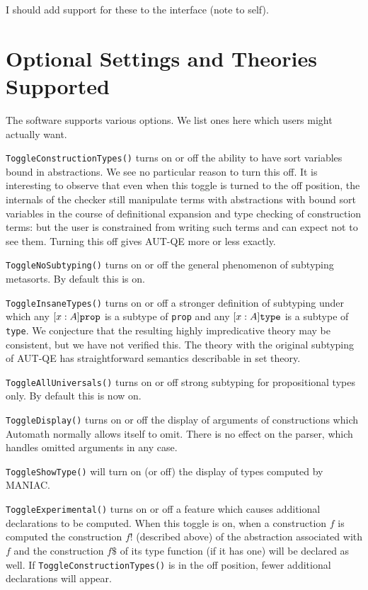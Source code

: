 \documentclass[12pt]{article}
\begin{document}
I should add support for these to the interface (note to self).

\newpage

\section{Optional Settings and Theories Supported}

The software supports various options.  We list ones here which users might actually want.

{\tt ToggleConstructionTypes()}  turns on or off the ability to have sort variables bound in abstractions.  We see no particular reason to turn this off.  It is interesting to observe that even when this toggle is turned to the off position, the internals of the checker still manipulate terms with abstractions with bound sort variables in the course of definitional expansion and type checking of construction terms:  but the user is constrained from writing such terms and can expect not to see them.  Turning this off gives AUT-QE more or less exactly.

{\tt ToggleNoSubtyping()} turns on or off the general phenomenon of subtyping metasorts.  By default this is on.

{\tt ToggleInsaneTypes()}  turns on or off a stronger definition of subtyping under which any $[x:A]{\tt prop}$ is a subtype of {\tt prop}
and any $[x:A]{\tt type}$ is a subtype of {\tt type}.  We conjecture that the resulting highly impredicative theory may be consistent, but we have not verified this.  The theory with the original subtyping of AUT-QE has straightforward semantics describable in set theory.

{\tt ToggleAllUniversals()} turns on or off strong subtyping for propositional types only.  By default this is now on.

{\tt ToggleDisplay()} turns on or off the display of arguments of constructions which Automath normally allows itself to omit.  There is no effect on the parser, which handles omitted arguments in any case.

{\tt ToggleShowType()} will turn on (or off) the display of types computed by MANIAC.

{\tt ToggleExperimental()} turns on or off a feature which causes additional declarations to be computed.  When this toggle is on, when a construction $f$ is computed the construction $f!$ (described above) of the abstraction associated with $f$ and the construction $f\$$ of its type function (if it has one) will be declared as well.  If {\tt ToggleConstructionTypes()} is in the off position, fewer additional declarations will appear.
\end{document}
